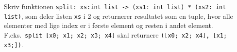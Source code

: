 Skriv funktionen \lstinline{split: xs:int list -> (xs1: int list) * (xs2: int list)}, som deler listen \lstinline{xs} i 2 og returnerer resultatet som en tuple, hvor alle elementer med lige index er i første element og resten i andet element. F.eks.\ \mbox{\lstinline{split [x0; x1; x2; x3; x4]}} skal returnere \mbox{\lstinline{([x0; x2; x4], [x1; x3;])}}.

